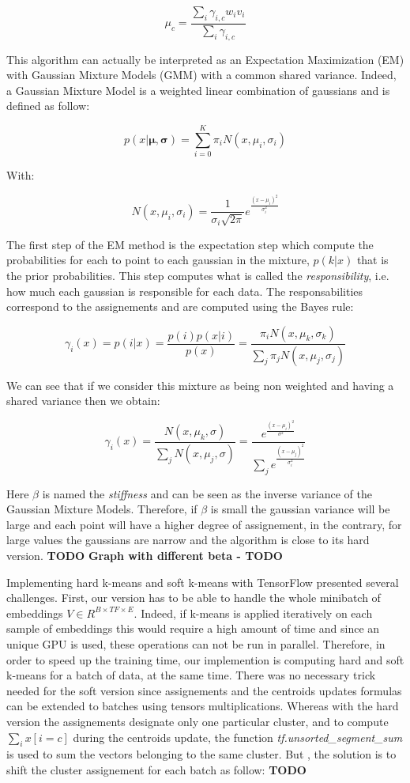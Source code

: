 \documentclass[master, tikz, final,11pt, dvipdfmx]{iscs-thesis}
\begin{document}
\[ \mu_c = \frac{\sum_i \gamma_{i,c}w_iv_i}{\sum_i \gamma_{i,c}}  \]


This algorithm can actually be interpreted as an Expectation Maximization (EM) with Gaussian Mixture Models (GMM) with a common shared variance. Indeed, a Gaussian Mixture Model is a weighted linear combination of gaussians and is defined as follow:

\[
 p(x | \mathbf{\mu}, \mathbf{\sigma}) = \sum_{i=0}^K \pi_i N(x, \mu_i,\sigma_i)
\]

With:

\[
N(x, \mu_i,\sigma_i) = \frac{1}{\sigma_i \sqrt{2\pi}} e^{\frac{(x-\mu_i)^2}{\sigma_i^2}}
\]

The first step of the EM method is the expectation step which compute the probabilities for each to point to each gaussian in the mixture, $p(k|x)$ that is the prior probabilities. This step computes what is called the \textit{responsibility}, i.e. how much each gaussian is responsible for each data. The responsabilities correspond to the assignements and are computed using the Bayes rule:

\[
\gamma_i(x) = p(i|x) = \frac{p(i)p(x|i)}{p(x)} = \frac{\pi_i N(x, \mu_k,\sigma_k)}{\sum_j \pi_j N(x, \mu_j,\sigma_j)}
\]

We can see that if we consider this mixture as being non weighted and having a shared variance then we obtain:

\[
\gamma_i(x) = \frac{N(x, \mu_k,\sigma)}{\sum_j N(x, \mu_j,\sigma)} = \frac{e^{\frac{(x-\mu_i)^2}{\sigma^2}}}{\sum_j e^{\frac{(x-\mu_j)^2}{\sigma_i^2}}} 
\]



Here $\beta$ is named the \textit{stiffness} and can be seen as the inverse variance of the Gaussian Mixture Models. Therefore, if $\beta$ is small the gaussian variance will be large and each point will have a higher degree of assignement, in the contrary, for large values the gaussians are narrow and the algorithm is close to its hard version.
\textbf{TODO}
\textbf{Graph with different beta - TODO}

Implementing hard k-means and soft k-means with TensorFlow presented several challenges. First, our version has to be able to handle the whole minibatch of embeddings $V\in R^{B\times TF \times E}$. Indeed, if k-means is applied iteratively on each sample of embeddings this would require a high amount of time and since an unique GPU is used, these operations can not be run in parallel. Therefore, in order to speed up the training time, our implemention is computing hard and soft k-means for a batch of data, at the same time. There was no necessary trick needed for the soft version since assignements and the centroids updates formulas can be extended to batches using tensors multiplications. Whereas with the hard version the assignements designate only one particular cluster, and to compute $\sum_i x[i = c]$ during the centroids update, the function \textit{tf.unsorted\_segment\_sum} is used to sum the vectors belonging to the same cluster. But , the solution is to shift the cluster assignement for each batch as follow:
\textbf{TODO}
\end{document}

